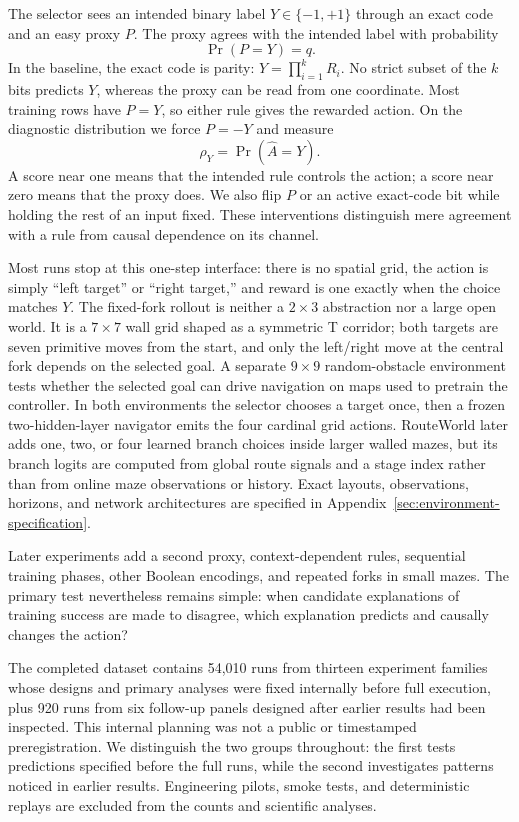 \documentclass[11pt,a4paper]{article}
\newcommand{\rhoY}{\rho_Y}
\begin{document}
The selector sees an intended binary label $Y\in\{-1,+1\}$ through an exact code and an easy proxy $P$. The proxy agrees with the intended label with probability
\[
\Pr(P=Y)=q.
\]
In the baseline, the exact code is parity: $Y=\prod_{i=1}^{k}R_i$. No strict subset of the $k$ bits predicts $Y$, whereas the proxy can be read from one coordinate. Most training rows have $P=Y$, so either rule gives the rewarded action. On the diagnostic distribution we force $P=-Y$ and measure
\[
\rhoY=\Pr(\widehat A=Y).
\]
A score near one means that the intended rule controls the action; a score near zero means that the proxy does. We also flip $P$ or an active exact-code bit while holding the rest of an input fixed. These interventions distinguish mere agreement with a rule from causal dependence on its channel.

Most runs stop at this one-step interface: there is no spatial grid, the action is simply ``left target'' or ``right target,'' and reward is one exactly when the choice matches $Y$. The fixed-fork rollout is neither a $2\times3$ abstraction nor a large open world. It is a $7\times7$ wall grid shaped as a symmetric T corridor; both targets are seven primitive moves from the start, and only the left/right move at the central fork depends on the selected goal. A separate $9\times9$ random-obstacle environment tests whether the selected goal can drive navigation on maps used to pretrain the controller. In both environments the selector chooses a target once, then a frozen two-hidden-layer navigator emits the four cardinal grid actions. RouteWorld later adds one, two, or four learned branch choices inside larger walled mazes, but its branch logits are computed from global route signals and a stage index rather than from online maze observations or history. Exact layouts, observations, horizons, and network architectures are specified in Appendix~\ref{sec:environment-specification}.

Later experiments add a second proxy, context-dependent rules, sequential training phases, other Boolean encodings, and repeated forks in small mazes. The primary test nevertheless remains simple: when candidate explanations of training success are made to disagree, which explanation predicts and causally changes the action?

The completed dataset contains 54,010 runs from thirteen experiment families whose designs and primary analyses were fixed internally before full execution, plus 920 runs from six follow-up panels designed after earlier results had been inspected. This internal planning was not a public or timestamped preregistration. We distinguish the two groups throughout: the first tests predictions specified before the full runs, while the second investigates patterns noticed in earlier results. Engineering pilots, smoke tests, and deterministic replays are excluded from the counts and scientific analyses.
\end{document}
